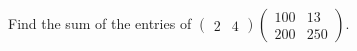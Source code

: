 Find the sum of the entries of $\begin{pmatrix}2&4\end{pmatrix}\begin{pmatrix}100&13\\200&250\end{pmatrix}$.
